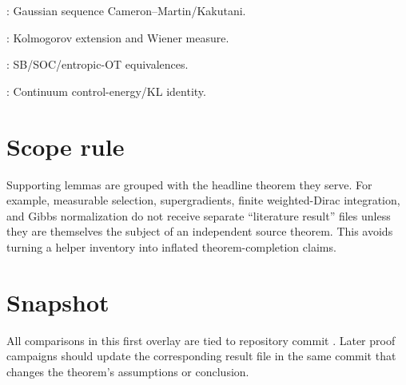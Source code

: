 \begin{description}[leftmargin=4.2em,style=nextline]
\item[\Class{S}] : Gaussian sequence Cameron--Martin/Kakutani.
\item[\Class{G/V}] : Kolmogorov extension and Wiener measure.
\item[\Class{A/P}] : SB/SOC/entropic-OT equivalences.
\item[\Class{A/P}] : Continuum control-energy/KL identity.
\end{description}

\section{Scope rule}
Supporting lemmas are grouped with the headline theorem they serve.  For example, measurable selection, supergradients, finite weighted-Dirac integration, and Gibbs normalization do not receive separate ``literature result'' files unless they are themselves the subject of an independent source theorem.  This avoids turning a helper inventory into inflated theorem-completion claims.

\section{Snapshot}
All comparisons in this first overlay are tied to repository commit \snapshot.  Later proof campaigns should update the corresponding result file in the same commit that changes the theorem's assumptions or conclusion.


